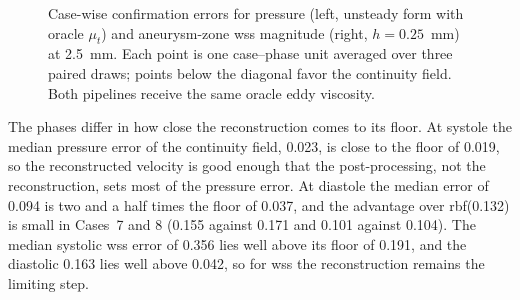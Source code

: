 \documentclass[12pt,a4paper]{article}
\newcommand{\WSS}{\ac{wss}\xspace}
\newcommand{\RBF}{\ac{rbf}\xspace}
\theoremstyle{definition}
\numberwithin{equation}{section}
\begin{document}


\begin{figure}[!htb]
\centering
\begin{minipage}{0.48\textwidth}
\centering
{}
\end{minipage}
\hfill
\begin{minipage}{0.48\textwidth}
\centering
{}
\end{minipage}
\caption{Case-wise confirmation errors for pressure (left, unsteady form with oracle $\mu_t$) and aneurysm-zone \WSS magnitude (right, $h=0.25$~mm) at 2.5~mm. Each point is one case--phase unit averaged over three paired draws; points below the diagonal favor the continuity field. Both pipelines receive the same oracle eddy viscosity.}
\label{fig:confirmation}
\end{figure}

The phases differ in how close the reconstruction comes to its floor. At systole the median pressure error of the continuity field, 0.023, is close to the floor of 0.019, so the reconstructed velocity is good enough that the post-processing, not the reconstruction, sets most of the pressure error. At diastole the median error of 0.094 is two and a half times the floor of 0.037, and the advantage over \RBF (0.132) is small in Cases~7 and 8 (0.155 against 0.171 and 0.101 against 0.104). The median systolic \WSS error of 0.356 lies well above its floor of 0.191, and the diastolic 0.163 lies well above 0.042, so for \WSS the reconstruction remains the limiting step.
\end{document}
